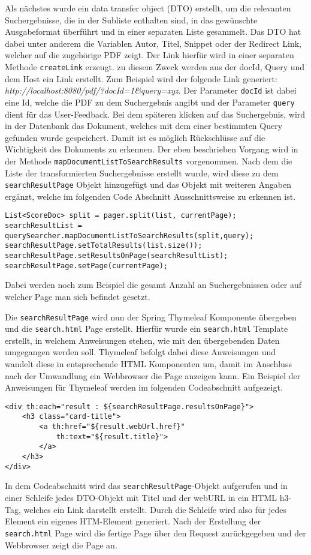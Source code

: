 Als nächstes wurde ein data transfer object (DTO) erstellt, um die relevanten Suchergebnisse, die in der Subliste enthalten sind, in das gewünschte Ausgabeformat überführt und in einer separaten  Liste gesammelt.
Das DTO hat dabei unter anderem die Variablen Autor, Titel, Snippet oder der Redirect Link, welcher auf die zugehörige PDF zeigt.   
Der Link hierfür wird in einer separaten Methode \texttt{createLink} erzeugt.
zu diesem Zweck werden aus der docId, Query und dem Host ein Link erstellt. 
Zum Beispiel wird der folgende Link generiert: \textit{http://localhost:8080/pdf/?docId=1\&query=xyz}.
Der Parameter \texttt{docId} ist dabei eine Id, welche die PDF zu dem Suchergebnis angibt und der Parameter \texttt{query} dient für das User-Feedback.
Bei dem späteren klicken auf das Suchergebnis, wird in der Datenbank das Dokument, welches mit dem einer bestimmten Query gefunden wurde gespeichert.
Damit ist es möglich Rückschlüsse auf die Wichtigkeit des Dokuments zu erkennen.
Der eben beschrieben Vorgang wird in der Methode \texttt{mapDocumentListToSearchResults} vorgenommen.
Nach dem die Liste der transformierten Suchergebnisse erstellt wurde, wird diese zu dem \texttt{searchResultPage} Objekt hinzugefügt und das Objekt mit weiteren Angaben ergänzt, welche im folgenden Code Abschnitt Ausschnittsweise zu erkennen ist.
\begin{lstlisting}
List<ScoreDoc> split = pager.split(list, currentPage);
searchResultList = querySearcher.mapDocumentListToSearchResults(split,query);
searchResultPage.setTotalResults(list.size());
searchResultPage.setResultsOnPage(searchResultList);
searchResultPage.setPage(currentPage);
\end{lstlisting}
Dabei werden noch zum Beispiel die gesamt Anzahl an Suchergebnissen oder auf welcher Page man sich befindet gesetzt.

Die \texttt{searchResultPage} wird nun der Spring Thymeleaf Komponente übergeben und die \texttt{search.html} Page erstellt.
Hierfür wurde ein \texttt{search.html} Template erstellt, in welchem Anweisungen stehen, wie mit den übergebenden Daten umgegangen werden soll.
Thymeleaf befolgt dabei diese Anweisungen und wandelt diese in entsprechende HTML Komponenten um, damit im Anschluss nach der Umwandlung ein Webbrowser die Page anzeigen kann.
Ein Beispiel der Anweisungen für Thymeleaf werden im folgenden Codeabschnitt aufgezeigt.
\begin{lstlisting}
<div th:each="result : ${searchResultPage.resultsOnPage}">
	<h3 class="card-title">
		<a th:href="${result.webUrl.href}"
			th:text="${result.title}">
		</a>
	</h3>
</div>
\end{lstlisting}
In dem Codeabschnitt wird das \texttt{searchResultPage}-Objekt aufgerufen und in einer Schleife jedes DTO-Objekt mit Titel und der webURL in ein HTML h3-Tag, welches ein Link darstellt erstellt.
Durch die Schleife wird also für jedes Element ein eigenes HTM-Element generiert.
Nach der Erstellung der \texttt{search.html} Page wird die fertige Page über den Request zurückgegeben und der Webbrowser zeigt die Page an.








